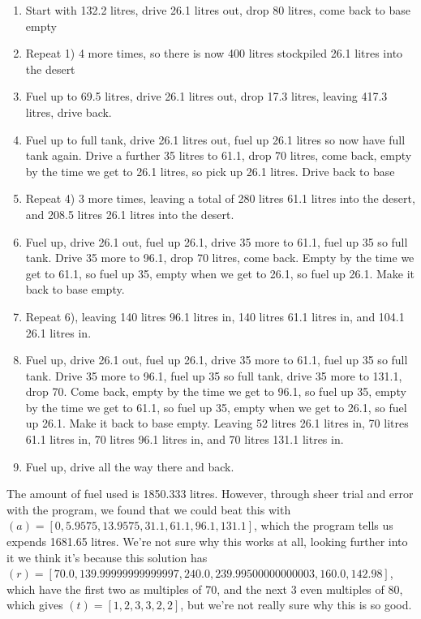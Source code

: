 \documentclass{homework}
\begin{document}
\begin{enumerate}
    \item Start with 132.2 litres, drive 26.1 litres out, drop 80 litres, come back to base empty
    \item Repeat 1) 4 more times, so there is now 400 litres stockpiled 26.1 litres into the desert
    \item Fuel up to 69.5 litres, drive 26.1 litres out, drop 17.3 litres, leaving 417.3 litres, drive back.
    \item Fuel up to full tank, drive 26.1 litres out, fuel up 26.1 litres so now have full tank again. Drive a further 35 litres to 61.1, drop 70 litres, come back, empty by the time we get to 26.1 litres, so pick up 26.1 litres. Drive back to base
    \item Repeat 4) 3 more times, leaving a total of 280 litres 61.1 litres into the desert, and 208.5 litres 26.1 litres into the desert.
    \item Fuel up, drive 26.1 out, fuel up 26.1, drive 35 more to 61.1, fuel up 35 so full tank. Drive 35 more to 96.1, drop 70 litres, come back. Empty by the time we get to 61.1, so fuel up 35, empty when we get to 26.1, so fuel up 26.1. Make it back to base empty.
    \item Repeat 6), leaving 140 litres 96.1 litres in, 140 litres 61.1 litres in, and 104.1 26.1 litres in.
    \item Fuel up, drive 26.1 out, fuel up 26.1, drive 35 more to 61.1, fuel up 35 so full tank. Drive 35 more to 96.1, fuel up 35 so full tank, drive 35 more to 131.1, drop 70. Come back, empty by the time we get to 96.1, so fuel up 35, empty by the time we get to 61.1, so fuel up 35, empty when we get to 26.1, so fuel up 26.1. Make it back to base empty. \newline
    Leaving 52 litres 26.1 litres in, 70 litres 61.1 litres in, 70 litres 96.1 litres in, and 70 litres 131.1 litres in.
    \item Fuel up, drive all the way there and back.
\end{enumerate}
The amount of fuel used is 1850.333 litres.
\newline\newline
However, through sheer trial and error with the program, we found that we could beat this with $(a) = [0,5.9575,13.9575,31.1,61.1,96.1,131.1]$, which the program tells us expends 1681.65 litres. We're not sure why this works at all, looking further into it we think it's because this solution has $(r) = [70.0, 139.99999999999997, 240.0, 239.99500000000003, 160.0, 142.98]$, which have the first two as multiples of 70, and the next 3 even multiples of 80, which gives $(t) = [1, 2, 3, 3, 2, 2]$, but we're not really sure why this is so good.
\end{document}
